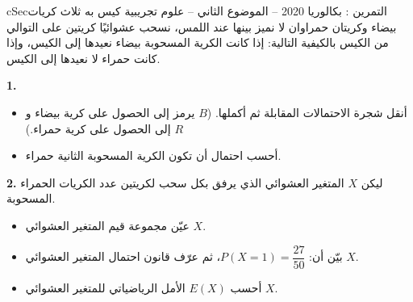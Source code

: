 \documentclass[12pt,a4paper]{article}
\newenvironment{BOX}[2]{\begin{otherlanguage}{english}\begin{arbox}{#1}{#2}}{\end{arbox}\end{otherlanguage}}
\newcounter{exo}
\newenvironment{tamrin}[1]{\stepcounter{exo}\begin{BOX}{cSec}{التمرين \theexo: #1}}{\end{BOX}}
\newenvironment{LTR}{\begin{otherlanguage}{english}}{\end{otherlanguage}}
\renewcommand{\ldots}{\mathinner{\ldotp\ldotp\ldotp}}
\newenvironment{sq}{\begin{itemize}[leftmargin=2.4em,itemsep=3pt]}{\end{itemize}}
\newcommand{\qa}{\item[(أ)]}\newcommand{\qb}{\item[(ب)]}\newcommand{\qc}{\item[(جـ)]}\newcommand{\qd}{\item[(د)]}\newcommand{\qe}{\item[(هـ)]}
\newcommand{\QQ}[1]{\par\smallskip\textbf{#1.} }
\begin{document}
\begin{tamrin}{بكالوريا 2020 -- الموضوع الثاني -- علوم تجريبية}
كيس به ثلاث كريات بيضاء وكريتان حمراوان لا نميز بينها عند اللمس، نسحب عشوائيًا كريتين على التوالي من الكيس بالكيفية التالية: إذا كانت الكرية المسحوبة بيضاء نعيدها إلى الكيس، وإذا كانت حمراء لا نعيدها إلى الكيس.
\begin{center}\begin{LTR}\end{LTR}\end{center}
\QQ{1}
\begin{sq}
\qa أنقل شجرة الاحتمالات المقابلة ثم أكملها. ($B$ يرمز إلى الحصول على كرية بيضاء و$R$ إلى الحصول على كرية حمراء.)
\qb أحسب احتمال أن تكون الكرية المسحوبة الثانية حمراء.
\end{sq}
\QQ{2} ليكن $X$ المتغير العشوائي الذي يرفق بكل سحب لكريتين عدد الكريات الحمراء المسحوبة.
\begin{sq}
\qa عيّن مجموعة قيم المتغير العشوائي $X$.
\qb بيّن أن: $P(X=1)=\dfrac{27}{50}$، ثم عرّف قانون احتمال المتغير العشوائي $X$.
\qc أحسب $E(X)$ الأمل الرياضياتي للمتغير العشوائي $X$.
\end{sq}
\end{tamrin}
\end{document}
